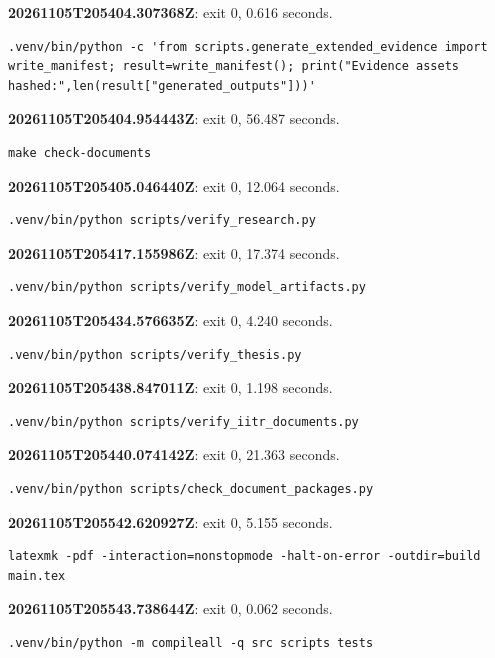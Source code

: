 \noindent\textbf{20261105T205404.307368Z}: exit 0, 0.616 seconds.
\begin{lstlisting}[numbers=none]
.venv/bin/python -c 'from scripts.generate_extended_evidence import write_manifest; result=write_manifest(); print("Evidence assets hashed:",len(result["generated_outputs"]))'
\end{lstlisting}

\noindent\textbf{20261105T205404.954443Z}: exit 0, 56.487 seconds.
\begin{lstlisting}[numbers=none]
make check-documents
\end{lstlisting}

\noindent\textbf{20261105T205405.046440Z}: exit 0, 12.064 seconds.
\begin{lstlisting}[numbers=none]
.venv/bin/python scripts/verify_research.py
\end{lstlisting}

\noindent\textbf{20261105T205417.155986Z}: exit 0, 17.374 seconds.
\begin{lstlisting}[numbers=none]
.venv/bin/python scripts/verify_model_artifacts.py
\end{lstlisting}

\noindent\textbf{20261105T205434.576635Z}: exit 0, 4.240 seconds.
\begin{lstlisting}[numbers=none]
.venv/bin/python scripts/verify_thesis.py
\end{lstlisting}

\noindent\textbf{20261105T205438.847011Z}: exit 0, 1.198 seconds.
\begin{lstlisting}[numbers=none]
.venv/bin/python scripts/verify_iitr_documents.py
\end{lstlisting}

\noindent\textbf{20261105T205440.074142Z}: exit 0, 21.363 seconds.
\begin{lstlisting}[numbers=none]
.venv/bin/python scripts/check_document_packages.py
\end{lstlisting}

\noindent\textbf{20261105T205542.620927Z}: exit 0, 5.155 seconds.
\begin{lstlisting}[numbers=none]
latexmk -pdf -interaction=nonstopmode -halt-on-error -outdir=build main.tex
\end{lstlisting}

\noindent\textbf{20261105T205543.738644Z}: exit 0, 0.062 seconds.
\begin{lstlisting}[numbers=none]
.venv/bin/python -m compileall -q src scripts tests
\end{lstlisting}

